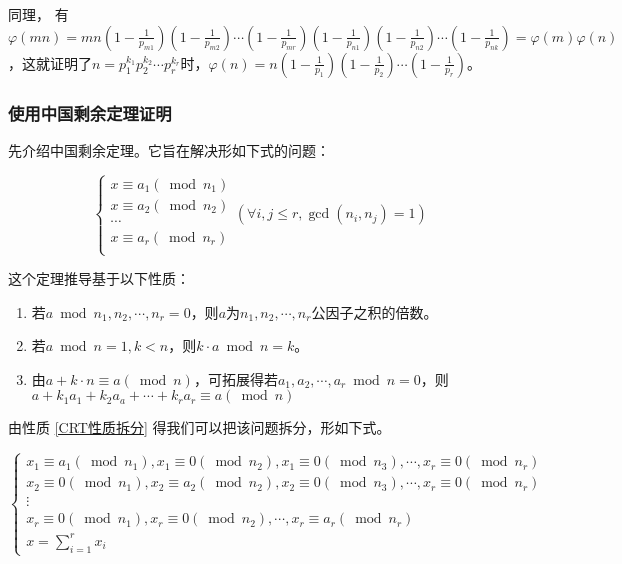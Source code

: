 \documentclass[a4paper]{article}         %
\begin{document}
同理，%
有$\varphi(mn)=mn(1-\frac{1}{p_{m1}})(1-\frac{1}{p_{m2}}) \cdots (1-\frac{1}{p_{mr}})(1-\frac{1}{p_{n1}})(1-\frac{1}{p_{n2}}) \cdots (1-\frac{1}{p_{nk}}) = \varphi(m)\varphi(n)$，这就证明了$n = p_{1}^{k_1}p_{2}^{k_2} \cdots p_{r}^{k_r}$时，$\varphi(n)=n(1-\frac{1}{p_1})(1-\frac{1}{p_2}) \cdots (1-\frac{1}{p_r})$。

\subsubsection{使用中国剩余定理证明}

先介绍中国剩余定理。它旨在解决形如下式的问题：

\begin{equation}
    \label{中国剩余定理问题方程组}
	\begin{cases}
		x \equiv a_1(\bmod n_1) \\
		x \equiv a_2(\bmod n_2) \\
		\cdots                  \\
		x \equiv a_r(\bmod n_r) \\
	\end{cases}
    (\forall i, j \leqslant r, \gcd(n_i, n_j) = 1)
\end{equation}

这个定理推导基于以下性质：

\begin{enumerate}
	\item \label{CRT性质找数} 若$a \bmod n_1,n_2, \cdots, n_r = 0$，则$a$为$n_1,n_2, \cdots, n_r$公因子之积的倍数。
	\item \label{CRT性质倍数} 若$a \bmod n = 1, k < n$，则$ k \cdot a \bmod n = k$。
	\item \label{CRT性质拆分} 由$a + k \cdot n \equiv a(\bmod n)$，可拓展得若$a_1,a_2,\cdots,a_r \bmod n = 0$，则$a + k_1a_1+k_2a_a+\cdots+k_ra_r \equiv a (\bmod n)$ %
\end{enumerate}

由性质 \ref{CRT性质拆分} 得我们可以把该问题拆分，形如下式。

\[
	\begin{cases}
		x_1 \equiv a_1(\bmod n_1), x_1 \equiv 0 (\bmod n_2), x_1 \equiv 0 (\bmod n_3), \cdots, x_r \equiv 0 (\bmod n_r)\\
		x_2 \equiv 0(\bmod n_1), x_2 \equiv a_2 (\bmod n_2), x_2 \equiv 0 (\bmod n_3), \cdots, x_r \equiv 0 (\bmod n_r)\\
		\vdots\\
		x_r \equiv 0(\bmod n_1), x_r \equiv 0 (\bmod n_2), \cdots, x_r \equiv a_r (\bmod n_r)\\
		x = \sum \limits_{i=1}^{r} x_i
	\end{cases}
\]
\end{document}

